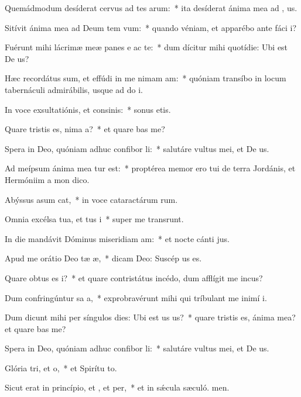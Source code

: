 \item Quemádmodum desíderat cervus ad tes arum:~* ita desíderat ánima mea ad , us.
\item Sitívit ánima mea ad Deum tem vum:~* quando véniam, et apparébo ante fáci i?
\item Fuérunt mihi lácrimæ meæ panes e ac te:~* dum dícitur mihi quotídie: Ubi est De us?
\item Hæc recordátus sum, et effúdi in me nimam am:~* quóniam transíbo in locum tabernáculi admirábilis, usque ad do i.
\item In voce exsultatiónis, et consinis:~* sonus etis.
\item Quare tristis es, nima a?~* et quare bas me?
\item Spera in Deo, quóniam adhuc confibor li:~* salutáre vultus mei, et De us.
\item Ad meípsum ánima mea tur est:~* proptérea memor ero tui de terra Jordánis, et Hermóniim a mon dico.
\item Abýssus asum cat,~* in voce cataractárum rum.
\item Omnia excélsa tua, et tus i~* super me transrunt.
\item In die mandávit Dóminus miseridiam am:~* et nocte cánti jus.
\item Apud me orátio Deo tæ æ,~* dicam Deo: Suscép us es.
\item Quare obtus es i?~* et quare contristátus incédo, dum afflígit me incus?
\item Dum confringúntur sa a,~* exprobravérunt mihi qui tríbulant me inimí i.
\item Dum dicunt mihi per síngulos dies: Ubi est us us?~* quare tristis es, ánima mea? et quare bas me?
\item Spera in Deo, quóniam adhuc confibor li:~* salutáre vultus mei, et De us.
\item Glória tri, et o,~* et Spirítu to.
\item Sicut erat in princípio, et , et per,~* et in sǽcula sæculó. men.
